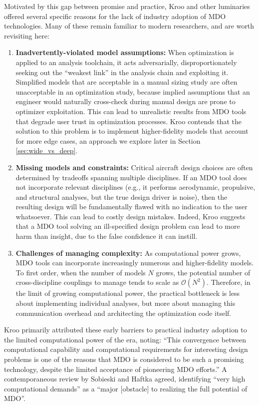 Motivated by this gap between promise and practice, Kroo and other luminaries offered several specific reasons for the lack of industry adoption of MDO technologies. Many of these remain familiar to modern researchers, and are worth revisiting here:

\begin{enumerate}
    \item \textbf{Inadvertently-violated model assumptions:} When optimization is applied to an analysis toolchain, it acts adversarially, disproportionately seeking out the ``weakest link'' in the analysis chain and exploiting it. Simplified models that are acceptable in a manual sizing study are often unacceptable in an optimization study, because implied assumptions that an engineer would naturally cross-check during manual design are prone to optimizer exploitation. This can lead to unrealistic results from MDO tools that degrade user trust in optimization processes. Kroo contends that the solution to this problem is to implement higher-fidelity models that account for more edge cases, an approach we explore later in Section \ref{sec:wide_vs_deep}.
    \item \textbf{Missing models and constraints:} Critical aircraft design choices are often determined by tradeoffs spanning multiple disciplines. If an MDO tool does not incorporate relevant disciplines (e.g., it performs aerodynamic, propulsive, and structural analyses, but the true design driver is noise), then the resulting design will be fundamentally flawed with no indication to the user whatsoever. This can lead to costly design mistakes. Indeed, Kroo suggests that a MDO tool solving an ill-specified design problem can lead to more harm than insight, due to the false confidence it can instill.
    \item \textbf{Challenges of managing complexity:} As computational power grows, MDO tools can incorporate increasingly numerous and higher-fidelity models. To first order, when the number of models $N$ grows, the potential number of cross-discipline couplings to manage tends to scale as $\mathcal{O}(N^2)$. Therefore, in the limit of growing computational power, the practical bottleneck is less about implementing individual analyses, but more about managing this communication overhead and architecting the optimization code itself.
\end{enumerate}

Kroo primarily attributed these early barriers to practical industry adoption to the limited computational power of the era, noting: ``This convergence between computational capability and computational requirements for interesting design problems is one of the reasons that MDO is considered to be such a promising technology, despite the limited acceptance of pioneering MDO efforts.'' A contemporaneous review by Sobieski and Haftka agreed, identifying ``very high computational demands'' as a ``major [obstacle] to realizing the full potential of MDO''. \cite{haftka_multidisciplinary_1997}

